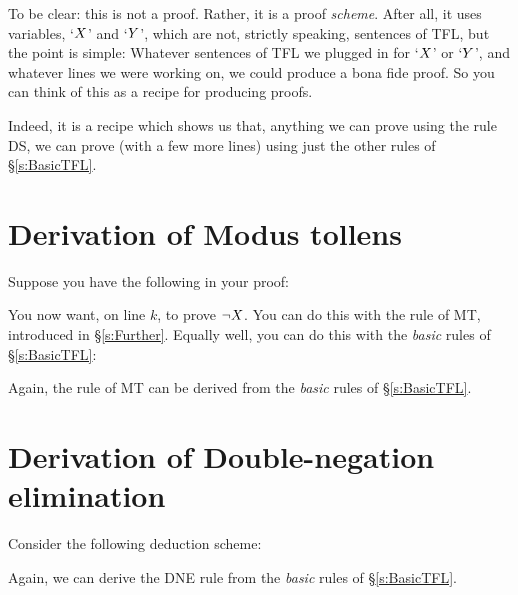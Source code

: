 To be clear: this is not a proof. Rather, it is a proof  \emph{scheme}. After all, it uses variables, `$X$' and `$Y$', which are not, strictly speaking, sentences of TFL, but the point is simple: Whatever sentences of TFL we plugged in for `$X$' or `$Y$', and whatever lines we were working on, we could produce a bona fide proof. So you can think of this as a recipe for producing proofs. 

Indeed, it is a recipe which shows us that, anything we can prove using the rule DS, we can prove (with a few more lines) using just the other rules of \S\ref{s:BasicTFL}. 
%

\section{Derivation of Modus tollens}
Suppose you have the following in your proof:
\begin{pf}
\end{pf}
You now want, on line $k$, to prove $\neg X$. You can do this with the rule of MT, introduced in \S\ref{s:Further}. Equally well, you can do this with the \emph{basic} rules of \S\ref{s:BasicTFL}:
\begin{pf}
		\open
		\close
\end{pf}
Again, the rule of MT can be derived from the \emph{basic} rules of \S\ref{s:BasicTFL}.

\section{Derivation of Double-negation elimination}
Consider the following deduction scheme:
	\begin{pf}
	\LEM
	\open
	\close
	\open
	\close
\end{pf}
Again,  we can derive the DNE rule from the \emph{basic} rules of \S\ref{s:BasicTFL}.

